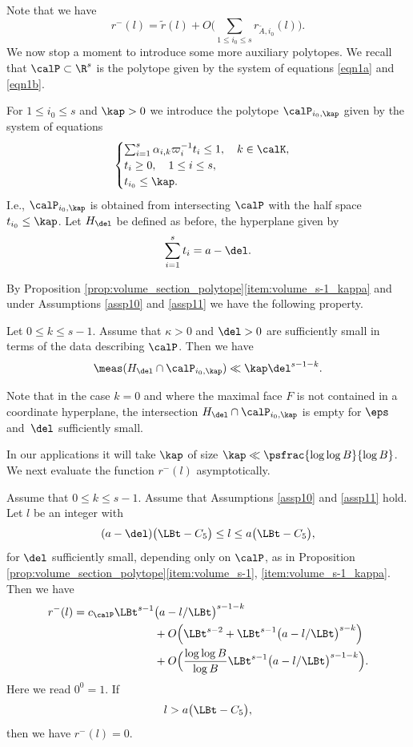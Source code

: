 Note that we have
\[
r^-(l)=\tilde{r}(l)+O\biggl(\sum_{1\leq i_0\leq s} r_{\tilde{A},i_0}(l)\biggr).
\]
We now stop a moment to introduce some more auxiliary polytopes. We recall that $\calP\subset \R^s$ is the polytope given by the system of equations \eqref{eqn1a} and \eqref{eqn1b}.\par
For $1\leq i_0\leq s$ and $\kap>0$ we introduce the polytope $\calP_{i_0,\kap}$ given by the system of equations
\[
\begin{cases}
\sum_{i=1}^s \alpha_{i,k} \varpi_i^{-1} t_i\leq 1,\quad k\in \calK,\\
t_i\geq 0,\quad 1\leq i\leq s,\\
t_{i_0}\leq \kap.
\end{cases}
\]
I.e., $\calP_{i_0,\kap}$ is obtained from intersecting $\calP$ with the half space $t_{i_0}\leq \kap$. Let $H_{\del}$ be defined as before, \ie the hyperplane given by
\[
\sum_{i=1}^s t_i= a-\del.
\]

By Proposition \ref{prop:volume_section_polytope}\eqref{item:volume_s-1_kappa} and under Assumptions \ref{assp10} and \ref{assp11} we have the following property.\par
Let $0\leq k\leq s-1$. Assume that $\kappa>0$ and $\del>0$ are sufficiently small in terms of the data describing $\calP$. Then we have
\begin{equation}\label{eqn65a}
\meas (H_{\del}\cap \calP_{i_0,\kap}) \ll \kap\del^{s-1-k}.
\end{equation}

\begin{remark}
Note that in the case $k=0$ and where the maximal face $F$ is not contained in a coordinate hyperplane, the intersection $H_{\del}\cap \calP_{i_0,\kap}$ is empty for $\eps$ and~$\del$ sufficiently small.\end{remark}

In our applications it will take $\kap$ of size $\kap\ll \psfrac{\log \log B}{\log B}$. We next evaluate the function $r^-(l)$ asymptotically.\par

\begin{lemma}\label{rmin}
Assume that $0\leq k\leq s-1$. Assume that Assumptions \ref{assp10} and \ref{assp11} hold.
Let $l$ be an integer with
\[
(a-\del) \bigl(\LBt-C_5\bigr) \leq l\leq a \bigl(\LBt-C_5\bigr) ,
\]
for $\del$ sufficiently small, depending only on $\calP$, as in Proposition \ref{prop:volume_section_polytope}\eqref{item:volume_s-1}, \eqref{item:volume_s-1_kappa}. 
Then we have
\begin{align*}
r^-(l)=c_{\calP} \LBt^{s-1}& \bigl(a- l/{\LBt}\bigr)^{s-1-k} \\
&+O\Bigl(\LBt^{s-2}+ \LBt^{s-1} \bigl(a- l/{\LBt}\bigr)^{s-k}\Bigr)\\
&+ O\Bigl(\frac{\log \log B}{\log B} \LBt^{s-1} \bigl(a- l/{\LBt}\bigr)^{s-1-k} \Bigr) .
\end{align*}
Here we read $0^0=1$.
If
\[
l> a \bigl(\LBt-C_5\bigr) ,
\]
then we have $r^-(l)=0$.
\end{lemma}

